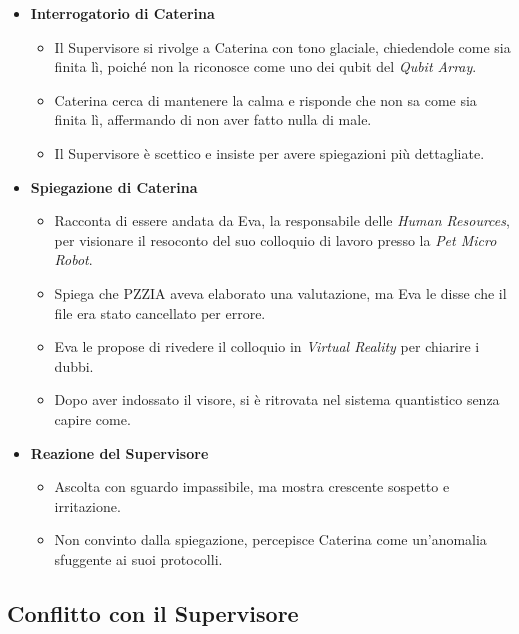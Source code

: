 \begin{itemize}
    \item \textbf{Interrogatorio di Caterina}
    \begin{itemize}
        \item Il Supervisore si rivolge a Caterina con tono glaciale, chiedendole come sia finita lì, poiché non la riconosce come uno dei qubit del \emph{Qubit Array}.
        \item Caterina cerca di mantenere la calma e risponde che non sa come sia finita lì, affermando di non aver fatto nulla di male.
        \item Il Supervisore è scettico e insiste per avere spiegazioni più dettagliate.
    \end{itemize}
    \item \textbf{Spiegazione di Caterina}
    \begin{itemize}
        \item Racconta di essere andata da Eva, la responsabile delle \emph{Human Resources}, per visionare il resoconto del suo colloquio di lavoro presso la \emph{Pet Micro Robot}.
        \item Spiega che PZZIA aveva elaborato una valutazione, ma Eva le disse che il file era stato cancellato per errore.
        \item Eva le propose di rivedere il colloquio in \emph{Virtual Reality} per chiarire i dubbi.
        \item Dopo aver indossato il visore, si è ritrovata nel sistema quantistico senza capire come.
    \end{itemize}
    \item \textbf{Reazione del Supervisore}
    \begin{itemize}
        \item Ascolta con sguardo impassibile, ma mostra crescente sospetto e irritazione.
        \item Non convinto dalla spiegazione, percepisce Caterina come un'anomalia sfuggente ai suoi protocolli.
    \end{itemize}
\end{itemize}

\subsection*{Conflitto con il Supervisore}

